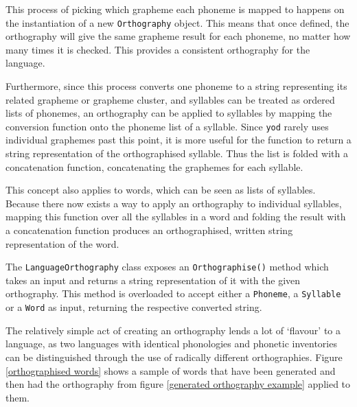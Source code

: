 \documentclass{report}
\begin{document}
	This process of picking which grapheme each phoneme is mapped to happens on the instantiation of a new \texttt{Orthography} object. This means that once defined, the orthography will give the same grapheme result for each phoneme, no matter how many times it is checked. This provides a consistent orthography for the language.
	
	Furthermore, since this process converts one phoneme to a string representing its related grapheme or grapheme cluster, and syllables can be treated as ordered lists of phonemes, an orthography can be applied to syllables by mapping the conversion function onto the phoneme list of a syllable. Since \texttt{yod} rarely uses individual graphemes past this point, it is more useful for the function to return a string representation of the orthographised syllable. Thus the list is folded with a concatenation function, concatenating the graphemes for each syllable.
	
	This concept also applies to words, which can be seen as lists of syllables. Because there now exists a way to apply an orthography to individual syllables, mapping this function over all the syllables in a word and folding the result with a concatenation function produces an orthographised, written string representation of the word.
	
	The \texttt{LanguageOrthography} class exposes an \texttt{Orthographise()} method which takes an input and returns a string representation of it with the given orthography. This method is overloaded to accept either a \texttt{Phoneme}, a \texttt{Syllable} or a \texttt{Word} as input, returning the respective converted string.
		
	The relatively simple act of creating an orthography lends a lot of `flavour' to a language, as two languages with identical phonologies and phonetic inventories can be distinguished through the use of radically different orthographies. Figure \ref{orthographised words} shows a sample of words that have been generated and then had the orthography from figure \ref{generated orthography example} applied to them.
	
\end{document}
